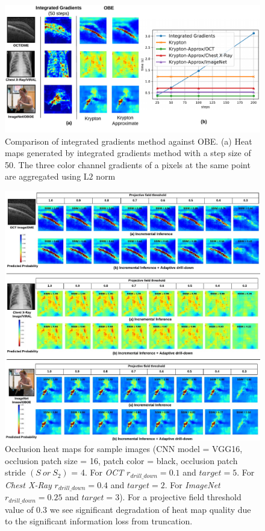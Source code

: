 \begin{figure}
\includegraphics[width=\columnwidth]{images/igd}
\vspace{-8mm}
\caption{Comparison of integrated gradients method against OBE. (a) Heat maps generated by integrated gradients method with a step size of 50. The three color channel gradients of a pixels at the same point are aggregated using L$2$ norm}
\vspace{-5mm}
\label{fig:igd}
\end{figure}

\begin{figure}[t]
\includegraphics[width=\textwidth]{images/visual_examples.jpeg}
\caption{Occlusion heat maps for sample images (CNN model = VGG16, occlusion patch size = 16, patch color = black, occlusion patch stride $(S~or~S_2)$ = 4. For \textit{OCT} $r_{drill\_down}=0.1$ and $\mathit{target}=5$. For \textit{Chest X-Ray} $r_{drill\_down}=0.4$ and $\mathit{target}=2$. For \textit{ImageNet} $r_{drill\_down}=0.25$ and $\mathit{target}=3$). For a projective field threshold value of $0.3$ we see significant degradation of heat map quality due to the significant information loss from truncation.}
\label{fig:visual_examples}
\end{figure}

